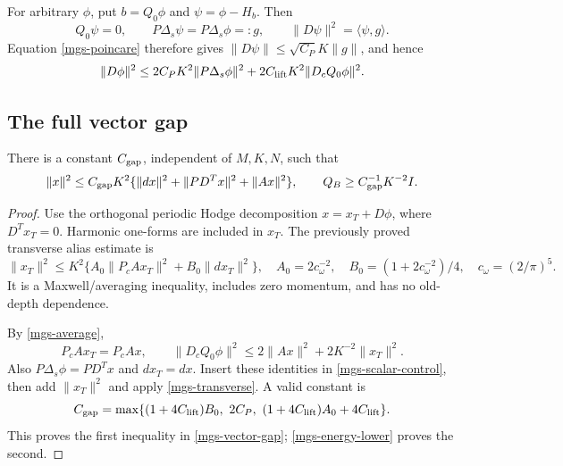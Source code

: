 For arbitrary \(\phi\), put \(b=Q_0\phi\) and
\(\psi=\phi-H_b\). Then
\[
 Q_0\psi=0,\qquad
 P\Delta_s\psi=P\Delta_s\phi=:g,\qquad
 \|D\psi\|^2=\langle\psi,g\rangle.
\]
Equation \eqref{mgs-poincare} therefore gives
\(\|D\psi\|\le\sqrt{C_P}K\|g\|\), and hence
\begin{equation}
 \|D\phi\|^2
 \le 2C_PK^2\|P\Delta_s\phi\|^2
           +2C_{\rm lift}K^2\|D_cQ_0\phi\|^2.
 \label{mgs-scalar-control}
\end{equation}

\subsection{The full vector gap}
\label{mgs-gap-section}

\begin{theorem}
\label{mgs-gap-theorem}
There is a constant \(C_{\rm gap}\), independent of \(M,K,N\),
such that
\begin{equation}
 \|x\|^2\le C_{\rm gap}K^2
       \{\|dx\|^2+\|PD^Tx\|^2+\|Ax\|^2\},
 \qquad
 Q_B\ge C_{\rm gap}^{-1}K^{-2}I .
 \label{mgs-vector-gap}
\end{equation}
\end{theorem}

\begin{proof}
Use the orthogonal periodic Hodge decomposition
\(x=x_T+D\phi\), where \(D^Tx_T=0\).
Harmonic one-forms are included in \(x_T\).
The previously proved transverse alias estimate is
\begin{equation}
 \|x_T\|^2\le K^2
       \{A_0\|P_cAx_T\|^2+B_0\|dx_T\|^2\},
 \quad
 A_0=2c_\omega^{-2},\quad
 B_0=(1+2c_\omega^{-2})/4,\quad c_\omega=(2/\pi)^5.
 \label{mgs-transverse}
\end{equation}
It is a Maxwell/averaging inequality, includes zero momentum,
and has no old-depth dependence.

By \eqref{mgs-average},
\[
 P_cAx_T=P_cAx,\qquad
 \|D_cQ_0\phi\|^2
 \le2\|Ax\|^2+2K^{-2}\|x_T\|^2.
\]
Also \(P\Delta_s\phi=PD^Tx\) and \(dx_T=dx\).
Insert these identities in \eqref{mgs-scalar-control},
then add \(\|x_T\|^2\) and apply \eqref{mgs-transverse}.
A valid constant is
\begin{equation}
 C_{\rm gap}=
 \max\{(1+4C_{\rm lift})B_0,\ 2C_P,\
               (1+4C_{\rm lift})A_0+4C_{\rm lift}\}.
 \label{mgs-gap-constant}
\end{equation}
This proves the first inequality in \eqref{mgs-vector-gap};
\eqref{mgs-energy-lower} proves the second.
\end{proof}

